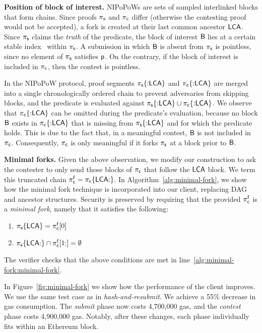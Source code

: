 \noindent \textbf{Position of block of interest.} NIPoPoWs are sets of sampled
interlinked blocks that form chains. Since proofs
$\mathsf{\pi_{s}}$ and $\mathsf{\pi_{c}}$ differ (otherwise the contesting proof would not be accepted),
a fork is created at
their last common ancestor $\mathsf{LCA}$. Since $\mathsf{\pi_{s}}$ claims the \emph{truth} of the
predicate, the block of interest $\mathsf{B}$ lies at a certain
stable index~\cite{nipopows,
generic-client} within $\mathsf{\pi_{s}}$. A submission in which $\mathsf{B}$ is
absent from $\mathsf{\pi_{s}}$ is pointless, since no element
of $\mathsf{\pi_{s}}$ satisfies $\mathsf{p}$. On the contrary, if the block of
interest is included in $\mathsf{\pi_{c}}$, then the contest is pointless.

\newcommand{\block}{\mathsf{B}}

In the NIPoPoW protocol, proof segments $\mathsf{\pi_{s}}\{{{:}}\mathsf{LCA}\}$ and
$\mathsf{\pi_{c}}\{{:}\mathsf{LCA}\}$ are merged into a single chronologically ordered chain to prevent adversaries from skipping
blocks, and the predicate is evaluated against $\mathsf{\pi_{s}}\{{:}\mathsf{LCA}\} \cup
\mathsf{\pi_{c}}\{{:}\mathsf{LCA}\}$. We observe that $\mathsf{\pi_{c}}\{{:}\mathsf{LCA}\}$ can be omitted during the predicate's evaluation, because no
block $\mathsf{B}$ exists in $\mathsf{\pi_{c}}\{{:}\mathsf{LCA}\}$ that is missing from $\mathsf{\pi_{s}}\{{:}\mathsf{LCA}\}$
and for which the predicate holds. This is due to the fact that, in a meaningful contest, $\mathsf{B}$
is not included in $\mathsf{\pi_{c}}$. Consequently, $\mathsf{\pi_{c}}$ is only meaningful if it forks
$\mathsf{\pi_{s}}$ at a block prior to $\mathsf{B}$.

\noindent \textbf{Minimal forks.} Given the above observation, we modify our construction
to ask the contester to only send those blocks of $\mathsf{\pi_{c}}$ that follow the $\mathsf{LCA}$ block.
We term this truncated chain $\mathsf{\pi_{c}^{f}} = \mathsf{\pi_{c}}\{\mathsf{LCA}{:}\}$.
In Algorithm~\ref{alg:minimal-fork}, we show how the minimal fork technique is
incorporated into our client, replacing DAG and ancestor structures.
Security is preserved by requiring that the provided $\mathsf{\pi_{c}^{f}}$ is a \emph{minimal fork}, namely
that it satisfies the following:

\begin{enumerate}
\item $\mathsf{\pi_{s}}\{\mathsf{LCA}\} = \mathsf{\pi_{c}^{f}}[0]$
\item $\mathsf{\pi_{s}}\{\mathsf{LCA}{:}\} \cap \mathsf{\pi_{c}^{f}}[1{:}] = \emptyset$
\end{enumerate}

The verifier checks that the above conditions are met in line~\ref{alg:minimal-fork:minimal-fork}.

In
Figure~\ref{fig:minimal-fork} we show how the performance of the client
improves. We use the same test case as in \emph{hash-and-resubmit}.
We achieve a 55\% decrease in gas
consumption. The \emph{submit} phase now costs {4{,}700{,}000} gas, and
the \emph{contest} phase costs {4{,}900{,}000} gas. Notably, after these
changes, each phase individually fits within an Ethereum block.

